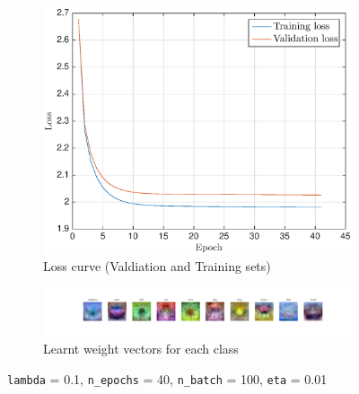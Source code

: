 \documentclass[journal, a4paper]{IEEEtran}
\begin{document}
\begin{figure}[h]
\centering

\begin{subfigure}{0.5\textwidth}
  \centering
  \includegraphics[scale=0.47]{figs/Loss_3}
  \caption{Loss curve (Valdiation and Training sets)}
\label{sf:31}
\end{subfigure}

\begin{subfigure}{0.5\textwidth}
  \centering
  \includegraphics[scale=0.25]{figs/WeightMatrix_3}
  \caption{Learnt weight vectors for each class}
\label{sf:32}
\end{subfigure}

  \caption{\texttt{lambda} = 0.1, \texttt{n\_epochs} = 40, \texttt{n\_batch} = 100, \texttt{eta} = 0.01}
\label{sf:3}

\end{figure}
\end{document}
